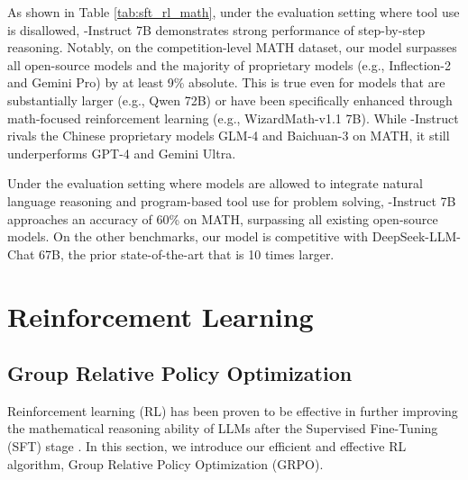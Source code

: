 As shown in Table \ref{tab:sft_rl_math}, under the evaluation setting where tool use is disallowed, \spmath-Instruct 7B demonstrates strong performance of step-by-step reasoning.
Notably, on the competition-level MATH dataset, our model surpasses all open-source models and the majority of proprietary models (e.g., Inflection-2 and Gemini Pro) by at least 9\% absolute.
This is true even for models that are substantially larger (e.g., Qwen 72B) or have been specifically enhanced through math-focused reinforcement learning (e.g., WizardMath-v1.1 7B).
While \spmath-Instruct rivals the Chinese proprietary models GLM-4 and Baichuan-3 on MATH, it still underperforms GPT-4 and Gemini Ultra.

Under the evaluation setting where models are allowed to integrate natural language reasoning and program-based tool use for problem solving, \spmath-Instruct 7B approaches an accuracy of 60\% on MATH, surpassing all existing open-source models.
On the other benchmarks, our model is competitive with DeepSeek-LLM-Chat 67B, the prior state-of-the-art that is 10 times larger.
\section{Reinforcement Learning}

\subsection{Group Relative Policy Optimization}
Reinforcement learning (RL) has been proven to be effective in further improving the mathematical reasoning ability of LLMs after the Supervised Fine-Tuning (SFT) stage \citep{wang2023math,wizardmath}.
In this section, we introduce our efficient and effective RL algorithm, Group Relative Policy Optimization (GRPO).




